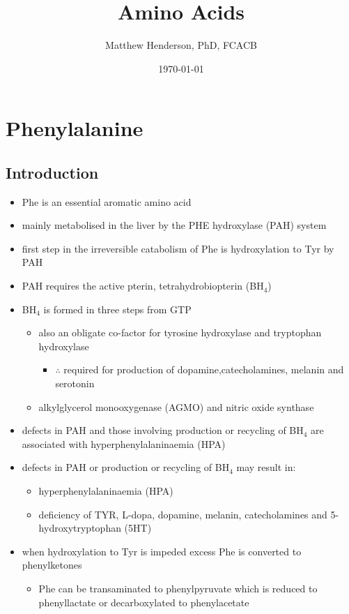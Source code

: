 \documentclass{scrartcl}
\author{Matthew Henderson, PhD, FCACB}
\date{\today}
\title{Amino Acids}
\begin{document}
\maketitle
\setcounter{tocdepth}{2}
\tableofcontents


\section{Phenylalanine}
\label{sec:org3299ab6}
\subsection{Introduction}
\label{sec:orge0e8e96}
\begin{itemize}
\item Phe is an essential aromatic amino acid
\item mainly metabolised in the liver by the PHE hydroxylase (PAH) system
\item first step in the irreversible catabolism of Phe is hydroxylation to
Tyr by PAH
\item PAH requires the active pterin, tetrahydrobiopterin (BH\(_{\text{4}}\))
\item BH\(_{\text{4}}\) is formed in three steps from GTP
\begin{itemize}
\item also an obligate co-factor for tyrosine hydroxylase and tryptophan hydroxylase
\begin{itemize}
\item \(\therefore\) required for production of dopamine,catecholamines,
melanin and serotonin
\end{itemize}
\item alkylglycerol monooxygenase (AGMO) and nitric oxide synthase
\end{itemize}

\item defects in PAH and those involving production or recycling of BH\(_{\text{4}}\)
are associated with hyperphenylalaninaemia (HPA)
\item defects in PAH or production or recycling of BH\(_{\text{4}}\) may result in:
\begin{itemize}
\item hyperphenylalaninaemia (HPA)
\item deficiency of TYR, L-dopa, dopamine, melanin, catecholamines and 5-hydroxytryptophan (5HT)
\end{itemize}
\item when hydroxylation to Tyr is impeded excess Phe is converted to phenylketones
\begin{itemize}
\item Phe can be transaminated to phenylpyruvate which is reduced to
phenyllactate or decarboxylated to phenylacetate
\end{itemize}
\end{itemize}
\end{document}
